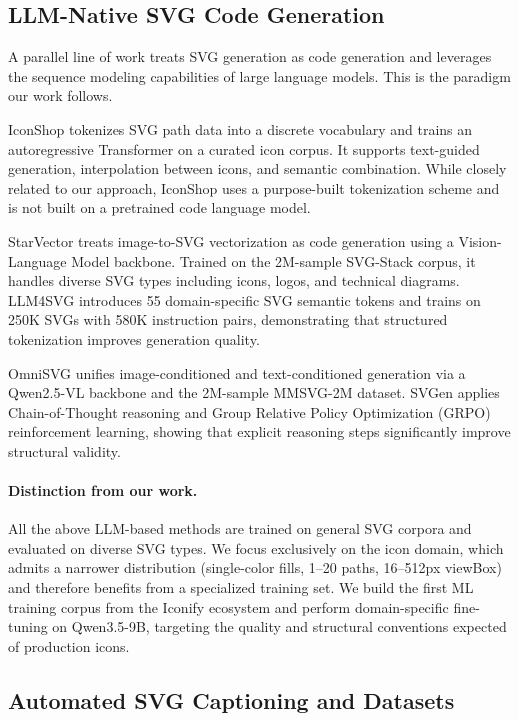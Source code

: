 \subsection{LLM-Native SVG Code Generation}

A parallel line of work treats SVG generation as code generation and leverages
the sequence modeling capabilities of large language models. This is the paradigm
our work follows.

IconShop \citep{wu2023iconshop} tokenizes SVG path data into a discrete vocabulary
and trains an autoregressive Transformer on a curated icon corpus. It supports
text-guided generation, interpolation between icons, and semantic combination.
While closely related to our approach, IconShop uses a purpose-built tokenization
scheme and is not built on a pretrained code language model.

StarVector \citep{rodriguez2025starvector} treats image-to-SVG vectorization as
code generation using a Vision-Language Model backbone. Trained on the 2M-sample
SVG-Stack corpus, it handles diverse SVG types including icons, logos, and
technical diagrams. LLM4SVG \citep{xing2025llm4svg} introduces 55 domain-specific
SVG semantic tokens and trains on 250K SVGs with 580K instruction pairs,
demonstrating that structured tokenization improves generation quality.

OmniSVG \citep{yang2025omnisvg} unifies image-conditioned and text-conditioned
generation via a Qwen2.5-VL backbone and the 2M-sample MMSVG-2M dataset. SVGen
\citep{svgen2025} applies Chain-of-Thought reasoning and Group Relative Policy
Optimization (GRPO) reinforcement learning, showing that explicit reasoning
steps significantly improve structural validity.

\paragraph{Distinction from our work.}
All the above LLM-based methods are trained on general SVG corpora and
evaluated on diverse SVG types. We focus exclusively on the icon domain, which
admits a narrower distribution (single-color fills, 1--20 paths, 16--512px
viewBox) and therefore benefits from a specialized training set. We build the
first ML training corpus from the Iconify ecosystem and perform
domain-specific fine-tuning on Qwen3.5-9B, targeting the quality and
structural conventions expected of production icons.

\subsection{Automated SVG Captioning and Datasets}


